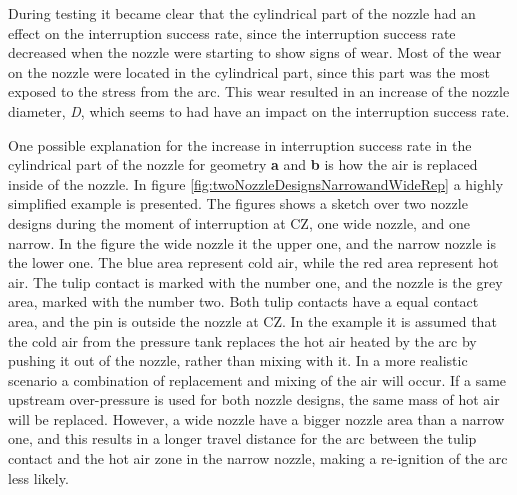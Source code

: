 \documentclass[10pt,b5paper,twoside]{article}
\begin{document}
During testing it became clear that the cylindrical part of the nozzle had an effect on the interruption success rate, since the interruption success rate decreased when the nozzle were starting to show signs of wear. Most of the wear on the nozzle were located in the cylindrical part, since this part was the most exposed to the stress from the arc. This wear resulted in an increase of the nozzle diameter, \textit{D}, which seems to had have an impact on the interruption success rate.

One possible explanation for the increase in interruption success rate in the cylindrical part of the nozzle for geometry \textbf{a} and \textbf{b} is how the air is replaced inside of the nozzle. In figure \ref{fig:twoNozzleDesignsNarrowandWideRep} a highly simplified example is presented. The figures shows a sketch over two nozzle designs during the moment of interruption at CZ, one wide nozzle, and one narrow. In the figure the wide nozzle it the upper one, and the narrow nozzle is the lower one. The blue area represent cold air, while the red area represent hot air. The tulip contact is marked with the number one, and the nozzle is the grey area, marked with the number two. Both tulip contacts have a equal contact area, and the pin is outside the nozzle at CZ. In the example it is assumed that the cold air from the pressure tank replaces the hot air heated by the arc by pushing it out of the nozzle, rather than mixing with it. In a more realistic scenario a combination of replacement and mixing of the air will occur. If a same upstream over-pressure is used for both nozzle designs, the same mass of hot air will be replaced. However, a wide nozzle have a bigger nozzle area than a narrow one, and this results in a longer travel distance for the arc between the tulip contact and the hot air zone in the narrow nozzle, making a re-ignition of the arc less likely.
\end{document}
